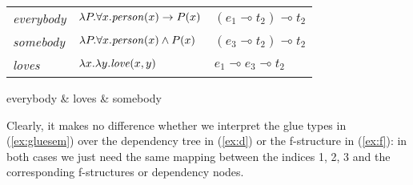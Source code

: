 \documentclass[output=paper,hidelinks]{langscibook}
\begin{document}
\begin{exe}
  \ex\label{ex:semantics}
  \begin{xlist}
    \ex \label{ex:gluesem} \begin{tabular}[t]{lll}
      \textit{everybody} & $\lambda P.\forall x.\mbox{\textnormal{\textit{person}}}(x) \rightarrow P(x)$ & $(e_1 \multimap t_2) \multimap t_2$ \\ 
      \textit{somebody}  & $\lambda P.\forall x.\mbox{\textnormal{\textit{person}}}(x) \land P(x)$ & $(e_3 \multimap t_2) \multimap t_2$ \\
      \textit{loves}     & $\lambda x.\lambda y.\mbox{\textnormal{\textit{love}}}(x,y)$ & $e_1 \multimap e_3 \multimap t_2 $ \\
      \end{tabular}
    \ex \label{ex:d}
      \begin{dependency}[baseline=-0.6ex,theme=simple]
        \begin{deptext}[column sep=1cm]
          everybody \& loves \& somebody \\
        \end{deptext}
      \end{dependency}

      \ex\label{ex:f}

  \end{xlist}
\end{exe}
%
Clearly, it makes no difference whether we interpret the glue types in
(\ref{ex:gluesem}) over the dependency tree in (\ref{ex:d}) or the
f-structure in (\ref{ex:f}): in both cases we just need the same mapping between the indices 1, 2, 3 and the corresponding f-structures or dependency nodes.
\end{document}

